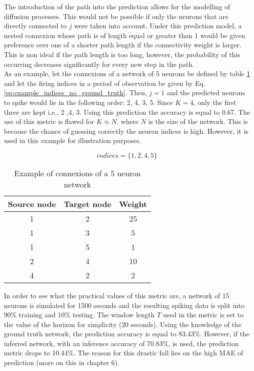 The introduction of the path into the prediction allows for the modelling of diffusion processes. This would not be possible if only the neurons that are directly connected to \(j\) were taken into account. Under this prediction model, a nested connexion whose path is of length equal or greater than 1 would be given preference over one of a shorter path length if the connectivity weight is larger. This is non ideal if the path length is too long, however, the probability of this occurring decreases significantly for every new step in the path. \\

As an example, let the connexions of a network of 5 neurons be defined by table \ref{tab:example_connexions_no_ground_truth} and let the firing indices in a period of observation be given by Eq.\ref{eq:example_indices_no_ground_truth}. Then, \(j=1\) and the predicted neurons to spike would lie in the following order: 2, 4, 3, 5. Since \(K=4\), only the first three are kept i.e., 2 ,4, 3. Using this prediction the accuracy is equal to 0.67. The use of this metric is flawed for \(K\approx N\), where \(N\) is the size of the network. This is because the chance of guessing correctly the neuron indices is high. However, it is used in this example for illustration purposes.

\begin{equation}
indices = \{1, 2, 4, 5\}
\label{eq:example_indices_no_ground_truth}
\end{equation}

\begin{table}[]
\centering
\begin{tabular}{|c|c|c|}
\hline
Source node & Target node & Weight \\ \hline
1           & 2           & 25     \\ \hline
1           & 3           & 5      \\ \hline
1           & 5           & 1      \\ \hline
2           & 4           & 10     \\ \hline
4           & 2           & 2      \\ \hline
\end{tabular}
\caption{Example of connexions of a 5 neuron network}
\label{tab:example_connexions_no_ground_truth}
\end{table}

In order to see what the practical values of this metric are, a network of 15 neurons is simulated for 1500 seconds and the resulting spiking data is split into 90\% training and 10\% testing. The window length \(T\) used in the metric is set to the value of the horizon for simplicity (20 seconds). Using the knowledge of the ground truth network, the prediction accuracy is equal to 83.43\%. However, if the inferred network, with an inference accuracy of 70.83\%, is used, the prediction metric drops to 10.44\%. The reason for this drastic fall lies on the high MAE of prediction (more on this in chapter 6).
